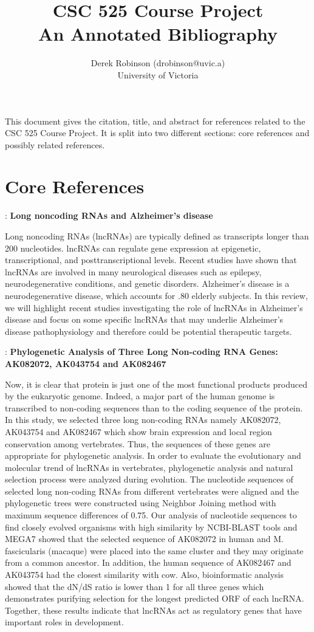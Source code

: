 \documentclass[11pt]{article}
\title{CSC 525 Course Project\\\medskip An Annotated Bibliography}
\author{Derek Robinson (drobinson@uvic.a)\\University of Victoria}
\begin{document}
\maketitle

This document gives the citation, title, and abstract for references related to the CSC 525 Course Project.
It is split into two different sections: core references and possibly related references.

\section{Core References}

\cite{luo2016long}: \textbf{Long noncoding RNAs and Alzheimer’s disease}

Long noncoding RNAs (lncRNAs) are typically defined as transcripts longer than
200 nucleotides. lncRNAs can regulate gene expression at epigenetic, transcriptional, and
posttranscriptional levels. Recent studies have shown that lncRNAs are involved in many
neurological diseases such as epilepsy, neurodegenerative conditions, and genetic disorders.
Alzheimer’s disease is a neurodegenerative disease, which accounts for .80%
elderly subjects. In this review, we will highlight recent studies investigating the role of lncRNAs
in Alzheimer’s disease and focus on some specific lncRNAs that may underlie Alzheimer’s
disease pathophysiology and therefore could be potential therapeutic targets.

\cite{amirmahani2018phylogenetic}: \textbf{Phylogenetic Analysis of Three Long Non-coding RNA Genes: AK082072,
AK043754 and AK082467}

Now, it is clear that protein is just one of the most functional products
produced by the eukaryotic genome. Indeed, a major part of the human
genome is transcribed to non-coding sequences than to the coding sequence of
the protein. In this study, we selected three long non-coding RNAs namely
AK082072, AK043754 and AK082467 which show brain expression and local
region conservation among vertebrates. Thus, the sequences of these genes
are appropriate for phylogenetic analysis. In order to evaluate the
evolutionary and molecular trend of lncRNAs in vertebrates, phylogenetic
analysis and natural selection process were analyzed during evolution. The
nucleotide sequences of selected long non-coding RNAs from different
vertebrates were aligned and the phylogenetic trees were constructed using
Neighbor Joining method with maximum sequence differences of 0.75. Our
analysis of nucleotide sequences to find closely evolved organisms with high
similarity by NCBI-BLAST tools and MEGA7 showed that the selected
sequence of AK082072 in human and M. fascicularis (macaque) were placed
into the same cluster and they may originate from a common ancestor. In
addition, the human sequence of AK082467 and AK043754 had the closest
similarity with cow. Also, bioinformatic analysis showed that the dN/dS ratio
is lower than 1 for all three genes which demonstrates purifying selection for
the longest predicted ORF of each lncRNA. Together, these results indicate
that lncRNAs act as regulatory genes that have important roles in
development.
\end{document}
